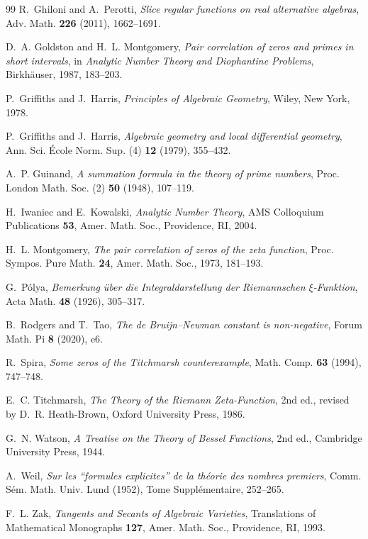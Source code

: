 \documentclass[11pt]{amsart}
\theoremstyle{plain}
\theoremstyle{definition}
\theoremstyle{remark}
\begin{document}
\begin{thebibliography}{99}
R.~Ghiloni and A.~Perotti,
\emph{Slice regular functions on real alternative algebras},
Adv. Math. \textbf{226} (2011), 1662--1691.

D.~A. Goldston and H.~L. Montgomery,
\emph{Pair correlation of zeros and primes in short intervals},
in \emph{Analytic Number Theory and Diophantine Problems}, Birkh\"auser, 1987, 183--203.

P.~Griffiths and J.~Harris,
\emph{Principles of Algebraic Geometry},
Wiley, New York, 1978.

P.~Griffiths and J.~Harris,
\emph{Algebraic geometry and local differential geometry},
Ann. Sci. \'Ecole Norm. Sup. (4) \textbf{12} (1979), 355--432.

A.~P. Guinand,
\emph{A summation formula in the theory of prime numbers},
Proc. London Math. Soc. (2) \textbf{50} (1948), 107--119.

H.~Iwaniec and E.~Kowalski,
\emph{Analytic Number Theory},
AMS Colloquium Publications \textbf{53}, Amer. Math. Soc., Providence, RI, 2004.

H.~L. Montgomery,
\emph{The pair correlation of zeros of the zeta function},
Proc. Sympos. Pure Math. \textbf{24}, Amer. Math. Soc., 1973, 181--193.

G.~P\'olya,
\emph{Bemerkung \"uber die Integraldarstellung der Riemannschen $\xi$-Funktion},
Acta Math. \textbf{48} (1926), 305--317.

B.~Rodgers and T.~Tao,
\emph{The de Bruijn--Newman constant is non-negative},
Forum Math. Pi \textbf{8} (2020), e6.

R.~Spira,
\emph{Some zeros of the Titchmarsh counterexample},
Math. Comp. \textbf{63} (1994), 747--748.

E.~C. Titchmarsh,
\emph{The Theory of the Riemann Zeta-Function}, 2nd ed., revised by D.~R. Heath-Brown,
Oxford University Press, 1986.

G.~N. Watson,
\emph{A Treatise on the Theory of Bessel Functions}, 2nd ed.,
Cambridge University Press, 1944.

A.~Weil,
\emph{Sur les ``formules explicites'' de la th\'eorie des nombres premiers},
Comm. S\'em. Math. Univ. Lund (1952), Tome Suppl\'ementaire, 252--265.

F.~L. Zak,
\emph{Tangents and Secants of Algebraic Varieties},
Translations of Mathematical Monographs \textbf{127},
Amer. Math. Soc., Providence, RI, 1993.

\end{thebibliography}
\end{document}
